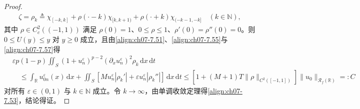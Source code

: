 ﻿\documentclass[../../main.tex]{subfiles}%
\begin{document}
\begin{proof}
\begin{align*}
\zeta=\rho_k\triangleq\chi_{[-k,k]}+\rho(\cdot-k)\chi_{[k,k+1)}+\rho(\cdot+k)\chi_{(-k-1,-k]}\quad(k\in\mathbb{N}),
\end{align*}
其中 $\rho\in C^2_c((-1,1))$ 满足 $\rho(0)=1$、$0\leqslant\rho\leqslant1$、$\rho'(0)=\rho''(0)=0$。则 $0\leqslant U(y)\leqslant y$ 对 $y\geqslant0$ 成立，且由\eqref{align:ch07-7.51}、\eqref{align:ch07-7.55}与\eqref{align:ch07-7.57}得
\begin{align*}
&\varepsilon p(1-p)\iint_S(1+u_n^\varepsilon)^{p-2}(\partial_xu_n^\varepsilon)^2\rho_k\,\mathrm{d}x\,\mathrm{d}t\\
&\quad\leqslant\int_{\mathbb{R}}u_{0n}^\varepsilon(x)\,\mathrm{d}x
+\iint_S[Mu_n^\varepsilon|\rho_k'|+\varepsilon u_n^\varepsilon|\rho_k''|]\,\mathrm{d}x\,\mathrm{d}t
\leqslant[1+(M+1)T\|\rho\|_{C^2([-1,1])}]\|u_0\|_{\mathscr{R}_f(\mathbb{R})}=:C
\end{align*}
对所有 $\varepsilon\in(0,1)$ 与 $k\in\mathbb{N}$ 成立。令 $k\to\infty$，由单调收敛定理得\eqref{align:ch07-7.53}，结论得证。
\end{proof}
\end{document}
